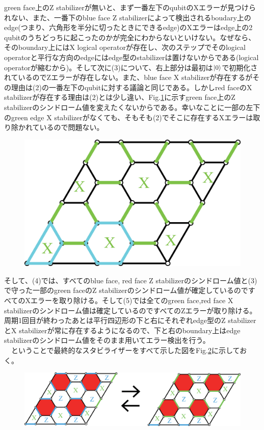 \documentclass[a4paper,10pt]{ltjsarticle}
\begin{document}
{    green face上のZ stabilizerが無いと、まず一番左下のqubitのXエラーが見つけられない、また、一番下のblue face Z stabilizerによって検出されるboudary上のedge(つまり、六角形を半分に切ったときにできるedge)のXエラーはedge上の2 qubitのうちどっちに起こったのかが完全にわからないといけない。なぜなら、そのboundary上にはX logical operatorが存在し、次のステップでそのlogical operatorと平行な方向のedgeにはedge型のstabilizerは置けないからである(logical operatorが縮むから)。そして次に(3)について、右上部分は最初は$\ket{0}$で初期化されているのでZエラーが存在しない。また、blue face X stabilizerが存在するがその理由は(2)の一番左下のqubitに対する議論と同じである。しかしred faceのX stabilizerが存在する理由は(2)とは少し違い、Fig.\ref{figure9}に示すgreen face上のZ stabilizerのシンドローム値を変えたくないからである。幸いなことに一部の左下のgreen edge X stabilizerがなくても、そもそも(2)でそこに存在するXエラーは取り除かれているので問題ない。
    
    \begin{figure}[h]
        \centering
        \includegraphics[scale=0.2]{figure/figure9.eps}
        \caption{ }
        \label{figure9}
    \end{figure}

    そして、(4)では、すべてのblue face, red face Z stabilizerのシンドローム値と(3)で守った一部のgreen faceのZ stabilizerのシンドローム値が確定しているのですべてのXエラーを取り除ける。そして(5)では全てのgreen face,red face X stabilizerのシンドローム値は確定しているのですべてのZエラーが取り除ける。周期1回目が終わったあとは平行四辺形の下と右にそれぞれedge型のZ stabilizerとX stabilizerが常に存在するようになるので、下と右のboundary上はedge stabilizerのシンドローム値をそのまま用いてエラー検出を行う。\\
    　ということで最終的なスタビライザーをすべて示した図をFig.\ref{figure10}に示しておく。

    \begin{figure}[h]
        \centering
        \includegraphics[scale=0.25]{figure/figure10.eps}
        \caption{ }
        \label{figure10}
    \end{figure}

    
}
\end{document}
